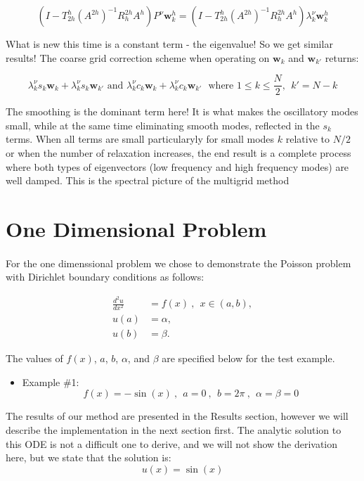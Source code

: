 \documentclass[pdftex,12pt,a4paper]{article}
\begin{document}
$$
\left(I - T_{2h}^h (A^{2h})^{-1} R_h^{2h} A^h \right) P^{\nu} \mathbf{w}_k^h = \left(I - T_{2h}^h (A^{2h})^{-1} R_h^{2h} A^h \right) \lambda^{\nu}_k  \mathbf{w}_k^h
$$

What is new this time is a constant term - the eigenvalue! So we get similar results!  The coarse grid correction scheme when operating on $\mathbf{w}_k$ and $\mathbf{w}_{k'}$ returns:

$$
\lambda_k^{\nu} s_k \mathbf{w}_k + \lambda_k^{\nu} s_k \mathbf{w}_{k'} \text{ and } \lambda_k^{\nu}c_k \mathbf{w}_k
+ \lambda_k^{\nu} c_k \mathbf{w}_{k'} ~~~ \text{where } 1 \leq k \leq \frac N 2, ~~ k' = N-k
$$

The smoothing is the dominant term here! It is what makes the oscillatory modes small, while at the same time eliminating smooth modes, reflected in the $s_k$ terms. When all terms are small particularyly for small modes $k$ relative to $N/2$ or when the number of relaxation increases, the end result is a complete process where both types of eigenvectors (low frequency and high frequency modes) are well damped. This is the spectral picture of the multigrid method








\section{One Dimensional Problem}
    
    \paragraph*{} For the one dimenssional problem we chose to demonstrate the Poisson problem with Dirichlet boundary conditions as follows:
    
    \begin{equation}
    \begin{aligned}
        \frac{d^2u}{dx^2} &= f(x) ~ , ~~ x \in (a, b), \\
        u(a) &= \alpha, \\
        u(b) &= \beta.
    \end{aligned}
    \end{equation}
    
    The values of $f(x)$, $a$, $b$, $\alpha$, and $\beta$ are specified below for the test example. \\
    \begin{itemize}
        \item Example \#1: 
            \begin{equation*}
                f(x) = -\sin(x) ~ , ~~ a = 0 ~ , ~~ b = 2 \pi ~ , ~~ \alpha = \beta = 0
            \end{equation*}

    \end{itemize}
    The results of our method are presented in the Results section, however we will describe the implementation in the next section first. The analytic solution to this ODE is not a difficult one to derive, and we will not show the derivation here, but we state that the solution is: $$ u(x) = \sin(x) $$
\end{document}
